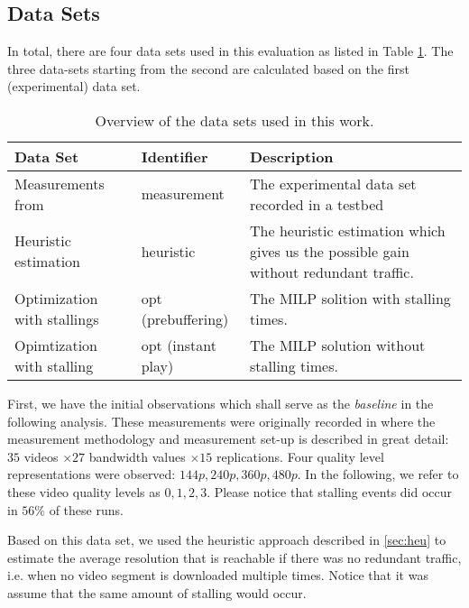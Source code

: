 
\subsection{Data Sets}

In total, there are four data sets used in this evaluation as listed in Table \ref{tab:datasets}. The three data-sets starting from the second are calculated based on the first (experimental) data set.
\begin{table}
\caption{Overview of the data sets used in this work.}
\label{tab:datasets}
\centering
\begin{tabular}{|p{2cm}|p{2.3cm}|p{3.2cm}|}
\hline 
Data Set & Identifier & Description \\ 
\hline 
Measurements from \cite{sieber16sacrificing} & measurement & The experimental data set recorded in a testbed \\ 
\hline 
Heuristic estimation & heuristic & The heuristic estimation which gives us the possible gain without redundant traffic. \\ 
\hline 
Optimization with stallings & opt (prebuffering) & The MILP solition with stalling times. \\ 
\hline 
Opimtization with stalling & opt (instant play) & The MILP solution without stalling times. \\ 
\hline 
\end{tabular} 
\end{table}

First, we have the initial observations which shall serve as the \textit{baseline} in the following analysis. These measurements were originally recorded in \cite{sieber16sacrificing} where the measurement methodology and measurement set-up is described in great detail: $35$ videos $\times 27$ bandwidth values $\times 15$ replications. Four quality level representations were observed: $144p, 240p, 360p, 480p$. In the following, we refer to these video quality levels as $0,1,2,3$. Please notice that stalling events did occur in $56\%$ of these runs.

Based on this data set, we used the heuristic approach described in \ref{sec:heu} to estimate the average resolution that is reachable if there was no redundant traffic, i.e. when no video segment is downloaded multiple times. Notice that it was assume that the same amount of stalling would occur.


